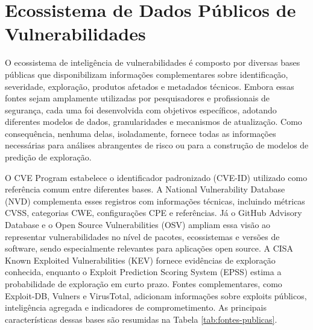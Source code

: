 \section{Ecossistema de Dados Públicos de Vulnerabilidades}

O ecossistema de inteligência de vulnerabilidades é composto por diversas bases públicas que disponibilizam informações complementares sobre identificação, severidade, exploração, produtos afetados e metadados técnicos. Embora essas fontes sejam amplamente utilizadas por pesquisadores e profissionais de segurança, cada uma foi desenvolvida com objetivos específicos, adotando diferentes modelos de dados, granularidades e mecanismos de atualização. Como consequência, nenhuma delas, isoladamente, fornece todas as informações necessárias para análises abrangentes de risco ou para a construção de modelos de predição de exploração.

O CVE Program estabelece o identificador padronizado (CVE-ID) utilizado como referência comum entre diferentes bases. A National Vulnerability Database (NVD) complementa esses registros com informações técnicas, incluindo métricas CVSS, categorias CWE, configurações CPE e referências. Já o GitHub Advisory Database e o Open Source Vulnerabilities (OSV) ampliam essa visão ao representar vulnerabilidades no nível de pacotes, ecossistemas e versões de software, sendo especialmente relevantes para aplicações open source. A CISA Known Exploited Vulnerabilities (KEV) fornece evidências de exploração conhecida, enquanto o Exploit Prediction Scoring System (EPSS) estima a probabilidade de exploração em curto prazo. Fontes complementares, como Exploit-DB, Vulners e VirusTotal, adicionam informações sobre exploits públicos, inteligência agregada e indicadores de comprometimento. As principais características dessas bases são resumidas na Tabela \ref{tab:fontes-publicas}.

